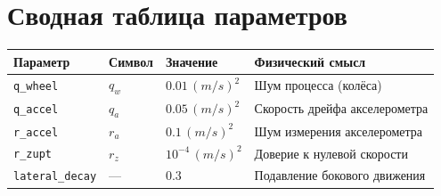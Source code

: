 \section{Сводная таблица параметров}

\begin{center}
\begin{tabular}{llll}
\toprule
\textbf{Параметр} & \textbf{Символ} & \textbf{Значение} & \textbf{Физический смысл}\\
\midrule
\texttt{q\_wheel} & $q_w$ & $0.01\,(m/s)^2$ & Шум процесса (колёса)\\
\texttt{q\_accel} & $q_a$ & $0.05\,(m/s)^2$ & Скорость дрейфа акселерометра\\
\texttt{r\_accel} & $r_a$ & $0.1\,(m/s)^2$ & Шум измерения акселерометра\\
\texttt{r\_zupt}  & $r_z$ & $10^{-4}\,(m/s)^2$ & Доверие к нулевой скорости\\
\texttt{lateral\_decay} & --- & $0.3$ & Подавление бокового движения\\
\bottomrule
\end{tabular}
\end{center}
